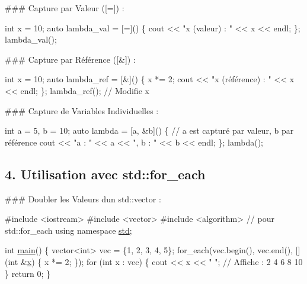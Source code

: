 \#\#\# Capture par Valeur ({\ttfamily \mbox{[}=\mbox{]}}) \+: 
\begin{DoxyCode}
\textcolor{keywordtype}{int} x = 10;
\textcolor{keyword}{auto} lambda\_val = [=]() \{
    cout << \textcolor{stringliteral}{"x (valeur) : "} << x << endl;
\};
lambda\_val();
\end{DoxyCode}


\#\#\# Capture par Référence ({\ttfamily \mbox{[}\&\mbox{]}}) \+: 
\begin{DoxyCode}
\textcolor{keywordtype}{int} x = 10;
\textcolor{keyword}{auto} lambda\_ref = [&]() \{
    x *= 2;
    cout << \textcolor{stringliteral}{"x (référence) : "} << x << endl;
\};
lambda\_ref(); \textcolor{comment}{// Modifie x}
\end{DoxyCode}


\#\#\# Capture de Variables Individuelles \+: 
\begin{DoxyCode}
\textcolor{keywordtype}{int} a = 5, b = 10;
\textcolor{keyword}{auto} lambda = [a, &b]() \{
    \textcolor{comment}{// a est capturé par valeur, b par référence}
    cout << \textcolor{stringliteral}{"a : "} << a << \textcolor{stringliteral}{", b : "} << b << endl;
\};
lambda();
\end{DoxyCode}
 



\subsection*{4. Utilisation avec {\ttfamily std\+::for\+\_\+each}}

\#\#\# Doubler les Valeurs d\textquotesingle{}un {\ttfamily std\+::vector} \+: 
\begin{DoxyCode}
\textcolor{preprocessor}{#include <iostream>}
\textcolor{preprocessor}{#include <vector>}
\textcolor{preprocessor}{#include <algorithm>} \textcolor{comment}{// pour std::for\_each}
\textcolor{keyword}{using namespace }\hyperlink{namespacestd}{std};

\textcolor{keywordtype}{int} \hyperlink{htop_8c_a3c04138a5bfe5d72780bb7e82a18e627}{main}() \{
    vector<int> vec = \{1, 2, 3, 4, 5\};
    for\_each(vec.begin(), vec.end(), [](\textcolor{keywordtype}{int} &\hyperlink{addition_8c_a6150e0515f7202e2fb518f7206ed97dc}{x}) \{ x *= 2; \});
    \textcolor{keywordflow}{for} (\textcolor{keywordtype}{int} x : vec) \{
        cout << x << \textcolor{stringliteral}{" "}; \textcolor{comment}{// Affiche : 2 4 6 8 10}
    \}
    \textcolor{keywordflow}{return} 0;
\}
\end{DoxyCode}
 



